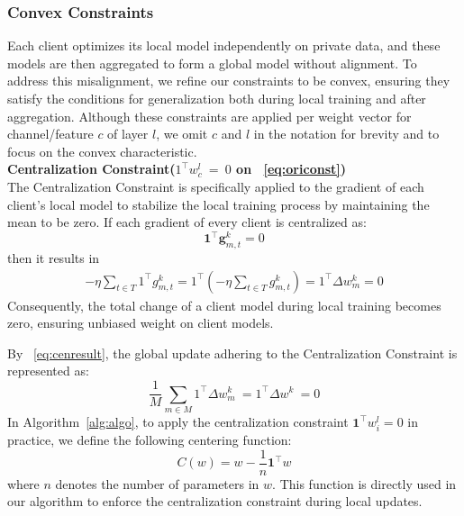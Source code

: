 \documentclass{article}
\theoremstyle{plain}
\theoremstyle{definition}
\theoremstyle{remark}
\begin{document}
\subsubsection{Convex Constraints}
Each client optimizes its local model independently on private data, and these models are then aggregated to form a global model without alignment. To address this misalignment, we refine our constraints to be convex, ensuring they satisfy the conditions for generalization both during local training and after aggregation. Although these constraints are applied per weight vector for channel/feature $c$ of layer $l$, we omit $c$ and $l$ in the notation  for brevity and to focus on the convex characteristic.  \\%
\textbf{Centralization Constraint($1^\top w_c^l\ =\ 0$ on ~\cref{eq:oriconst})}\\ 
The Centralization Constraint is specifically applied to the gradient of each client's local model to stabilize the local training process by maintaining the mean to be zero. If each gradient of every client is centralized as:
\begin{equation}
\bm{1}^\top \bm{g}_{m,t}^{k} = 0 
\end{equation}
then it results in
\begin{gather}
 -\eta \sum_{t \in T} 1^\top g_{m,t}^k = 1^\top (-\eta \sum_{t \in T} g_{m,t}^k) = 1^\top \Delta w_{m}^k = 0
\label{eq:cenresult}
\end{gather}
Consequently, the total change of a client model during local training becomes zero, ensuring unbiased weight on client models. 

By ~\cref{eq:cenresult}, the global update adhering to the Centralization Constraint is represented as:
\begin{equation}
\frac{1}{M}\sum _{m\in M}^{\ }1^\top \Delta w_m^k\ =  1^\top \Delta w^k\ = 0
\end{equation}
In Algorithm~\ref{alg:algo}, to apply the centralization constraint \( \bm{1}^\top w_i^l = 0 \) in practice, we define the following centering function:
\begin{equation}
C(w) = w - \frac{1}{n} \bm{1}^\top w
\label{eq:center}
\end{equation}
where \( n \) denotes the number of parameters in \( w \). This function is directly used in our algorithm to enforce the centralization constraint during local updates.
\end{document}
